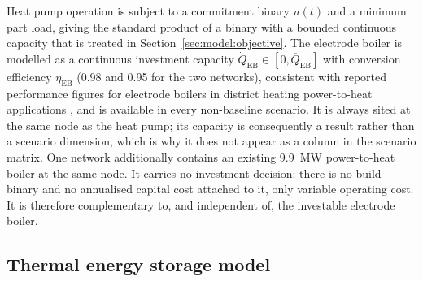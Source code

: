 \documentclass[review,3p]{elsarticle}
\begin{document}
Heat pump operation is subject to a commitment binary $u(t)$ and a
minimum part load, giving the standard product of a binary with a
bounded continuous capacity that is treated in
Section~\ref{sec:model:objective}. The electrode boiler is modelled as a
continuous investment capacity
$\dot{Q}_{\mathrm{EB}} \in [0, \overline{Q}_{\mathrm{EB}}]$ with
conversion efficiency $\eta_{\mathrm{EB}}$ (\num{0.98} and \num{0.95}
for the two networks), consistent with reported performance figures for
electrode boilers in district heating power-to-heat applications
\cite{DiBacciCapaci.2022,Bottger.2019}, and is available in every
non-baseline scenario.
It is always sited at the same node as the heat pump; its capacity is
consequently a result rather than a scenario dimension, which is why it
does not appear as a column in the scenario matrix. One network
additionally contains an existing \SI{9.9}{\mega\watt} power-to-heat
boiler at the same node. It carries no investment decision:
there is no build binary and no annualised capital cost attached to it,
only variable operating cost. It is therefore complementary to, and
independent of, the investable electrode boiler.

\subsection{Thermal energy storage model}
\label{sec:model:tes}
\end{document}
